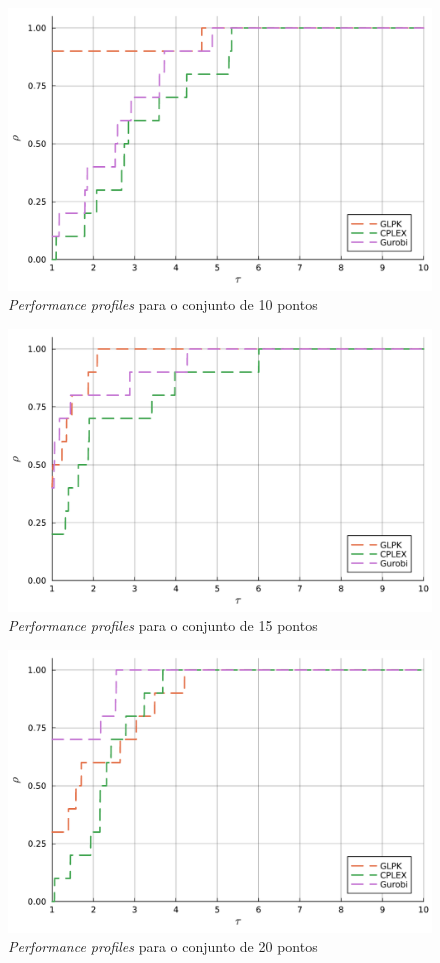 \begin{figure}
    \centering
    \caption{\emph{Performance profiles} para o conjunto de 10 pontos}
    \label{fig:pgraph10}
    \includegraphics[scale=0.6]{imagens/pgraph10.pdf}
\end{figure}
\begin{figure}
    \centering
    \caption{\emph{Performance profiles} para o conjunto de 15 pontos}
    \label{fig:pgraph15}
    \includegraphics[scale=0.6]{imagens/pgraph15.pdf}
\end{figure}
\begin{figure}
    \centering
    \caption{\emph{Performance profiles} para o conjunto de 20 pontos}
    \label{fig:pgraph20}
    \includegraphics[scale=0.6]{imagens/pgraph20.pdf}
\end{figure}

